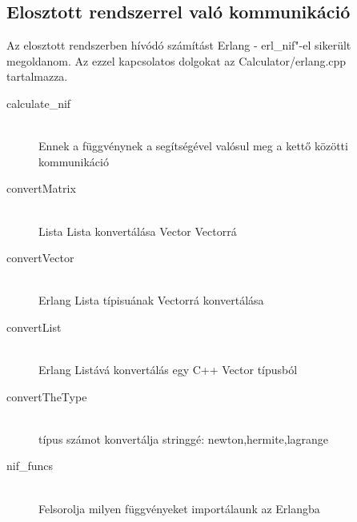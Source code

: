 \subsection{Elosztott rendszerrel való kommunikáció}
	Az elosztott rendszerben hívódó számítást Erlang - erl\_nif"-el sikerült megoldanom. 
	Az ezzel kapcsolatos dolgokat az Calculator/erlang.cpp tartalmazza.
	\begin{description}
		\item[calculate\_nif] \hfill \\
		Ennek a függvénynek a segítségével valósul meg a kettő közötti kommunikáció
		\item[convertMatrix] \hfill \\
		Lista Lista konvertálása Vector Vectorrá
		\item[convertVector] \hfill \\
		Erlang Lista típisuának Vectorrá konvertálása
		\item[convertList] \hfill \\
		Erlang Listává konvertálás egy C++ Vector típusból
		\item[convertTheType] \hfill \\
			típus számot konvertálja stringgé: newton,hermite,lagrange
		\item[nif\_funcs] \hfill \\
			Felsorolja milyen függvényeket importálaunk az Erlangba
	\end{description}
	
